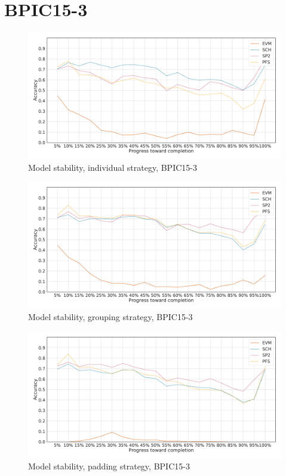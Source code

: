 \section*{BPIC15-3}\label{appendix:stability:2015-3}
\begin{figure}[!htb]
    \centering
    \includegraphics[width=\textwidth]{gfx/bpic2015_3/individual_stability.pdf}
    \caption{Model stability, individual strategy, BPIC15-3}
    \label{fig:bpic15-3-individual-stability}
\end{figure}
\begin{figure}[!htb]
    \centering
    \includegraphics[width=\textwidth]{gfx/bpic2015_3/grouped_stability.pdf}
    \caption{Model stability, grouping strategy, BPIC15-3}
    \label{fig:bpic15-3-grouped-stability}
\end{figure}
\begin{figure}[!htb]
    \centering
    \includegraphics[width=\textwidth]{gfx/bpic2015_3/padded_stability.pdf}
    \caption{Model stability, padding strategy, BPIC15-3}
    \label{fig:bpic15-3-padded-stability}
\end{figure}
